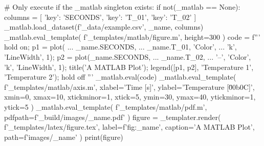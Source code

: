 # Only execute if the _matlab singleton exists:
if not(_matlab == None):
    columns = [
        {'key': 'SECONDS'},
        {'key': 'T_01'},
        {'key': 'T_02'}
    ]
    _matlab.load_dataset(f'{_data}/example.csv', _name, columns)
    _matlab.eval_template(
        f'{_templates}/matlab/figure.m',
        height=300
    )
    code = f'''
        hold on;
        p1 = plot( ...
            {_name}.SECONDS, ...
            {_name}.T_01, 'Color',  ...
            'k', 'LineWidth', 1);
        p2 = plot({_name}.SECONDS, ...
            {_name}.T_02, ...
            '--', 'Color', 'k', 'LineWidth', 1);
        title('A MATLAB Plot');
        legend([p1, p2], 'Temperature 1', 'Temperature 2');
        hold off
    '''
    _matlab.eval(code)
    _matlab.eval_template(
        f'{_templates}/matlab/axis.m',
        xlabel='Time [s]',
        ylabel='Temperature [\u00b0C]',
        xmin=0,
        xmax=10,
        xtickminor=1,
        xtick=5,
        ymin=30,
        ymax=40,
        ytickminor=1,
        ytick=5
    )
    _matlab.eval_template(
        f'{_templates}/matlab/pdf.m',
        pdfpath=f'{_build}/images/{_name}.pdf'
    )
figure = _templater.render(
    f'{_templates}/latex/figure.tex',
    label=f'fig:{_name}',
    caption='A MATLAB Plot',
    path=f'images/{_name}'
)
print(figure)

